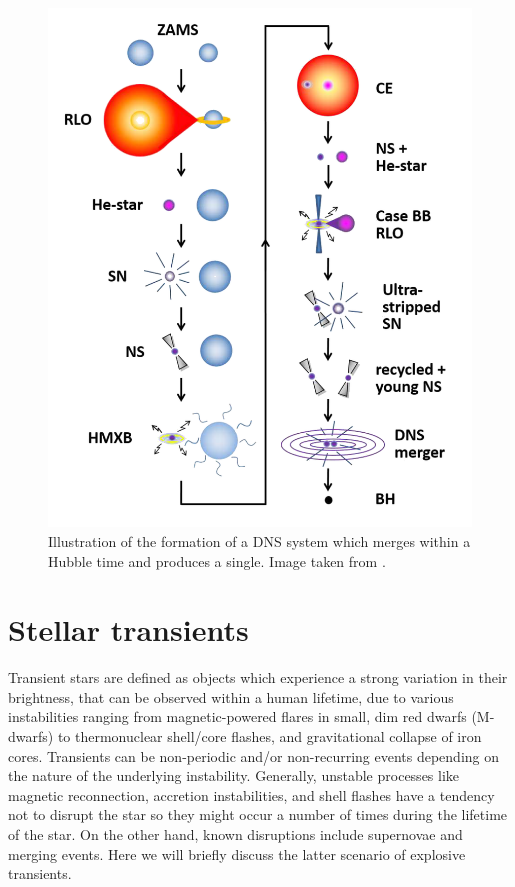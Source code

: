 \documentclass[../../main/thesis_msc.tex]{subfiles}
\begin{document}
				\begin{figure}[h]
					\centering
					\includegraphics[scale = 0.85]{../figures/chapter1/DNS_formation_transparent.png}
					\caption{Illustration of the formation of a DNS system which merges within a Hubble time and produces a single. Image taken from \cite{Tauris2017}.}
					\label{fig:DNS}
				\end{figure}
				
	\section{Stellar transients}
	
		Transient stars are defined as objects which experience a strong variation in their brightness, that can be observed within a human lifetime, due to various instabilities ranging from magnetic-powered flares in small, dim red dwarfs (M-dwarfs) to thermonuclear shell/core flashes, and gravitational collapse of iron cores. Transients can be non-periodic and/or non-recurring events depending on the nature of the underlying instability. Generally, unstable processes like magnetic reconnection, accretion instabilities, and shell flashes have a tendency not to disrupt the star so they might occur a number of times during the lifetime of the star. On the other hand, known disruptions include supernovae and merging events. Here we will briefly discuss the latter scenario of explosive transients.
		
\end{document}

